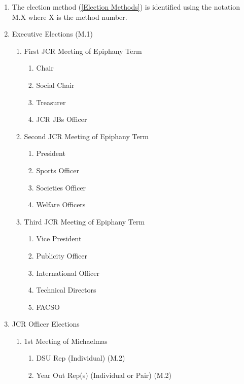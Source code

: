 \label{Election Schedule}
\begin{enumerate}
    \item The election method (\ref{Election Methods}) is identified using the notation M.X where X is the method number.
    \item Executive Elections (M.1)
    \begin{enumerate}
        \item First JCR Meeting of Epiphany Term
        \begin{enumerate}
            \item Chair
            \item Social Chair 
            \item Treasurer 
            \item JCR JBs Officer
        \end{enumerate}
        \item Second JCR Meeting of Epiphany Term
        \begin{enumerate}
            \item President
            \item Sports Officer 
            \item Societies Officer 
            \item Welfare Officers
        \end{enumerate}
        \item Third JCR Meeting of Epiphany Term
        \begin{enumerate}
            \item Vice President 
            \item Publicity Officer 
            \item International Officer 
            \item Technical Directors
            \item FACSO
        \end{enumerate}
    \end{enumerate}
    \item JCR Officer Elections
    \begin{enumerate}
        \item 1st Meeting of Michaelmas
        \begin{enumerate}
            \item DSU Rep (Individual) (M.2)
            \item Year Out Rep(s) (Individual or Pair) (M.2)

\end{enumerate}
\end{enumerate}
\end{enumerate}
